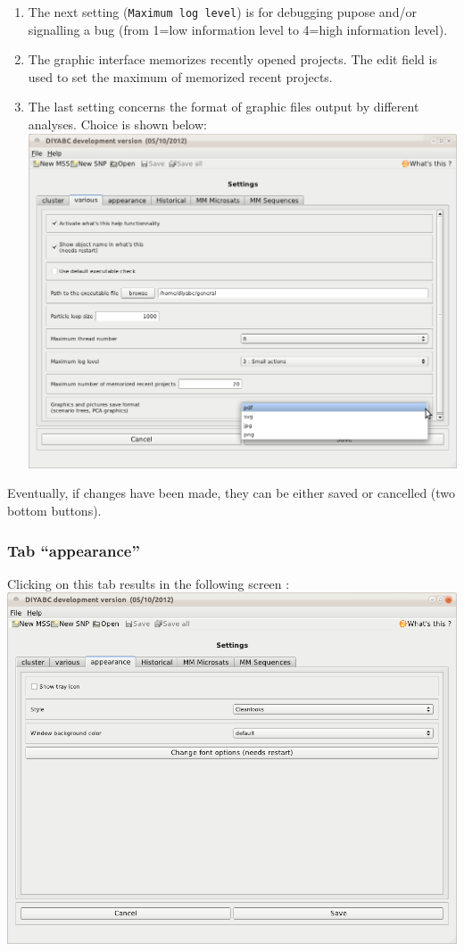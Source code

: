 \begin{enumerate}
\item The next setting (\texttt{Maximum log level}) is for debugging pupose
and/or signalling a bug (from 1=low information level to 4=high information
level).
\item The graphic interface memorizes recently opened projects. The edit
field is used to set the maximum of memorized recent projects.
\item The last setting concerns the format of graphic files output by different
analyses. Choice is shown below:\\
 \includegraphics[scale=0.33]{gui_pictures/Capture-DIYABC-97} \\

\end{enumerate}
Eventually, if changes have been made, they can be either saved or
cancelled (two bottom buttons).


\subsubsection{Tab \textsf{``appearance''}}

Clicking on this tab results in the following screen :\\


\includegraphics[scale=0.33]{gui_pictures/Capture-DIYABC-98} \\



